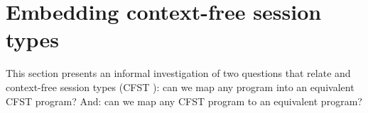 \section{Embedding context-free session types}
\label{sec:cfst-vs-algst}





This section presents an informal investigation of two questions that relate \algst and
context-free session types (CFST
\cite{DBLP:journals/corr/abs-2106-06658}): can we map any \algst
program into an equivalent CFST program? And: can we map any CFST program to an
equivalent \algst program?

